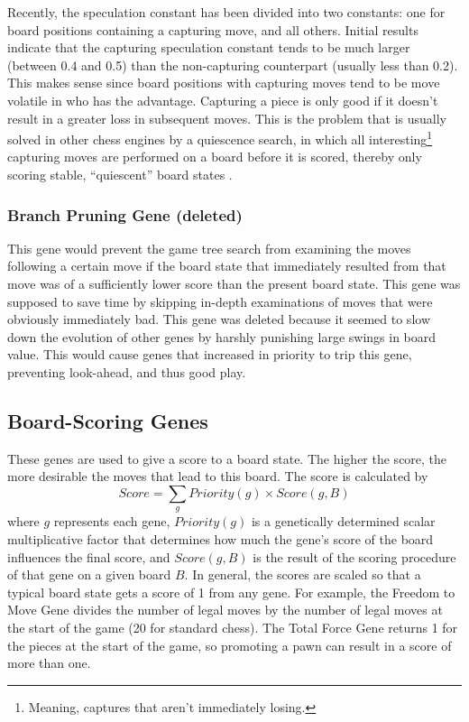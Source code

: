 \documentclass[letterpaper]{article}
\renewcommand{\_}{\allowbreak\textunderscore\allowbreak}
\begin{document}
Recently, the speculation constant has been divided into two constants: one for board positions containing a capturing move, and all others. Initial results indicate that the capturing speculation constant tends to be much larger (between 0.4 and 0.5) than the non-capturing counterpart (usually less than 0.2). This makes sense since board positions with capturing moves tend to be move volatile in who has the advantage. Capturing a piece is only good if it doesn't result in a greater loss in subsequent moves. This is the problem that is usually solved in other chess engines by a quiescence search, in which all interesting\footnote{Meaning, captures that aren't immediately losing.} capturing moves are performed on a board before it is scored, thereby only scoring stable, ``quiescent'' board states \cite{quiescence-ref}.

\subsubsection{Branch Pruning Gene (deleted)}

This gene would prevent the game tree search from examining the moves following a certain move if the board state that immediately resulted from that move was of a sufficiently lower score than the present board state. This gene was supposed to save time by skipping in-depth examinations of moves that were obviously immediately bad. This gene was deleted because it seemed to slow down the evolution of other genes by harshly punishing large swings in board value. This would cause genes that increased in priority to trip this gene, preventing look-ahead, and thus good play.

\subsection{Board-Scoring Genes}
These genes are used to give a score to a board state. The higher the score, the more desirable the moves that lead to this board. The score is calculated by
\[Score = \sum_g Priority(g) \times Score(g,B)\]
where \(g\) represents each gene, \(Priority(g)\) is a genetically determined scalar multiplicative factor that determines how much the gene's score of the board influences the final score, and \(Score(g,B)\) is the result of the scoring procedure of that gene on a given board \(B\). In general, the scores are scaled so that a typical board state gets a score of 1 from any gene. For example, the Freedom to Move Gene divides the number of legal moves by the number of legal moves at the start of the game (20 for standard chess). The Total Force Gene returns 1 for the pieces at the start of the game, so promoting a pawn can result in a score of more than one.
\end{document}
